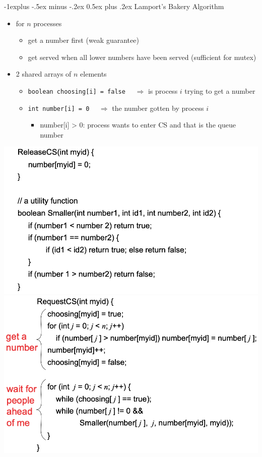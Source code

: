 \documentclass[10pt, landscape]{article}
\makeatletter
\renewcommand{\subsection}{\@startsection{subsection}{2}{0mm}%
  {-1explus -.5ex minus -.2ex}%
  {0.5ex plus .2ex}%
{\normalfont\normalsize\bfseries}}
\makeatother
\begin{document}
\begin{multicols*}{3}
  \subsection{Lamport's Bakery Algorithm}

  \begin{itemize}
    \item for $n$ processes
      \begin{itemize}
        \item get a number first (weak guarantee)
        \item get served when all lower numbers have been served (sufficient for mutex)
      \end{itemize}
    \item 2 shared arrays of $n$ elements
      \begin{itemize}
        \item \texttt{boolean choosing[i] = false} $\quad\Rightarrow$ is process $i$ trying to get a number
        \item \texttt{int number[i] = 0} $\quad \Rightarrow$ the number gotten by process $i$
          \begin{itemize}
            \item number[i] > 0: process wants to enter CS and that is the queue number
          \end{itemize}
      \end{itemize}
  \end{itemize}

  \begin{tightcenter}
    \includegraphics[width=0.7\linewidth]{cs4231-lamport-algo-release.png} 
    \includegraphics[width=0.7\linewidth]{cs4231-lamport-algo-request.png} 
  \end{tightcenter}


\end{multicols*}
\end{document}
